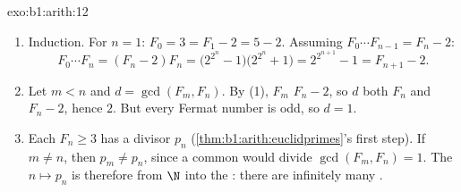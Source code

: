 \begin{solution}{exo:b1:arith:12}
\begin{enumerate}
  \item Induction. For $n = 1$: $F_0 = 3 = F_1 - 2 = 5 - 2$.
        Assuming $F_0\cdots F_{n-1} = F_n - 2$:
        \[
        F_0 \cdots F_n = (F_n - 2)F_n
        = \bigl(2^{2^n} - 1\bigr)\bigl(2^{2^n} + 1\bigr)
        = 2^{2^{n+1}} - 1 = F_{n+1} - 2 .
        \]
  \item Let $m < n$ and $d = \gcd(F_m, F_n)$. By (1), $F_m$
         $F_n - 2$, so $d$  both $F_n$ and $F_n -
        2$, hence  $2$. But every Fermat number is odd, so
        $d = 1$.
  \item Each $F_n \geq 3$ has a  divisor $p_n$
        (\cref{thm:b1:arith:euclidprimes}'s first step). If $m
        \neq n$, then $p_m \neq p_n$, since a common  would
        divide $\gcd(F_m, F_n) = 1$. The  $n \mapsto p_n$ is
        therefore  from $\N$ into the : there are
        infinitely many .
\end{enumerate}
\end{solution}

